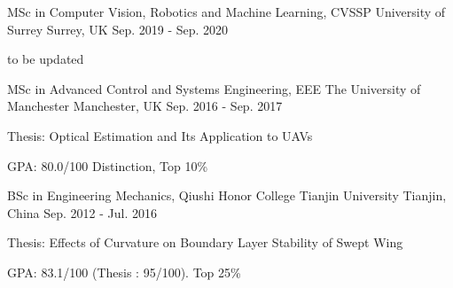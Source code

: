 

\begin{cventries}

   \cventry
    {MSc in Computer Vision, Robotics and Machine Learning,  CVSSP} %
    {University of Surrey} %
    {Surrey, UK} %
    {Sep. 2019 - Sep. 2020} %
    {
      \begin{cvitems} %
        \item {to be updated}
      \end{cvitems}
    }
  \cventry
    {MSc in Advanced Control and Systems Engineering,  EEE} %
    {The University of Manchester} %
    {Manchester, UK} %
    {Sep. 2016 - Sep. 2017} %
    {
      \begin{cvitems} %
        \item {Thesis: Optical Estimation and Its Application to UAVs}
        \item {GPA: 80.0/100 Distinction, Top 10\%}
      \end{cvitems}
    }

  \cventry
    {BSc in Engineering Mechanics, Qiushi Honor College} %
    {Tianjin University} %
    {Tianjin, China} %
    {Sep. 2012 - Jul. 2016} %
    {
      \begin{cvitems} %
        \item {Thesis: Effects of Curvature on Boundary Layer Stability of Swept Wing}
        \item {GPA: 83.1/100 (Thesis : 95/100). Top 25\%}
      \end{cvitems}
    }

\end{cventries}
